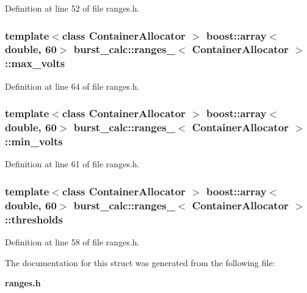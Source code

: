 \-Definition at line 52 of file ranges.\-h.

\subsubsection[{max\-\_\-volts}]{\setlength{\rightskip}{0pt plus 5cm}template$<$class Container\-Allocator $>$ boost\-::array$<$double, 60$>$ {\bf burst\-\_\-calc\-::ranges\-\_\-}$<$ \-Container\-Allocator $>$\-::{\bf max\-\_\-volts}}\label{structburst__calc_1_1ranges___a16b1f2b731edf21d7871f88c60ec7717}


\-Definition at line 64 of file ranges.\-h.

\subsubsection[{min\-\_\-volts}]{\setlength{\rightskip}{0pt plus 5cm}template$<$class Container\-Allocator $>$ boost\-::array$<$double, 60$>$ {\bf burst\-\_\-calc\-::ranges\-\_\-}$<$ \-Container\-Allocator $>$\-::{\bf min\-\_\-volts}}\label{structburst__calc_1_1ranges___a6c1c793272f3678e5da396681601a713}


\-Definition at line 61 of file ranges.\-h.

\subsubsection[{thresholds}]{\setlength{\rightskip}{0pt plus 5cm}template$<$class Container\-Allocator $>$ boost\-::array$<$double, 60$>$ {\bf burst\-\_\-calc\-::ranges\-\_\-}$<$ \-Container\-Allocator $>$\-::{\bf thresholds}}\label{structburst__calc_1_1ranges___ac59baa4582b3d3003f892c2f5b5ee73b}


\-Definition at line 58 of file ranges.\-h.



\-The documentation for this struct was generated from the following file\-:\begin{DoxyCompactItemize}
\item 
{\bf ranges.\-h}\end{DoxyCompactItemize}
